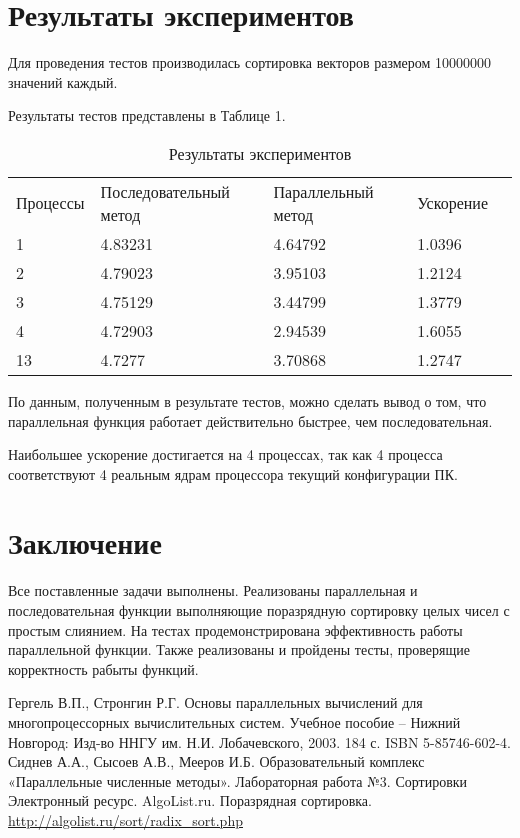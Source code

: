 \documentclass{report}
\begin{document}
	\section*{Результаты экспериментов}
	Для проведения тестов производилась сортировка векторов размером 10000000 значений каждый. 
	\par Результаты тестов представлены в Таблице 1.
	\begin{table}[!h]
		\caption{Результаты экспериментов}
		\centering
		\begin{tabular}{lllll}
			Процессы & Последовательный метод & Параллельный метод & Ускорение   \\
			1        & 4.83231                & 4.64792            & 1.0396      \\
			2        & 4.79023                & 3.95103            & 1.2124      \\
			3        & 4.75129                & 3.44799            & 1.3779      \\
			4        & 4.72903                & 2.94539            & 1.6055      \\
			13       & 4.7277                 & 3.70868            & 1.2747
		\end{tabular}
	\end{table}
	\par По данным, полученным в результате тестов, можно сделать вывод о том, что параллельная функция работает действительно быстрее, чем последовательная.
	\par Наибольшее ускорение достигается на 4 процессах, так как 4 процесса соответствуют 4 реальным ядрам процессора текущий конфигурации ПК.
	\newpage
	
	\section*{Заключение}
	Все поставленные задачи выполнены. Реализованы параллельная и последовательная функции выполняющие поразрядную сортировку целых чисел с простым слиянием. На тестах продемонстрирована эффективность работы параллельной функции. Также реализованы и пройдены тесты, проверящие корректность рабыты функций.
	\newpage
	
	\begin{thebibliography}{1}
         Гергель В.П., Стронгин Р.Г. Основы параллельных вычислений для многопроцессорных вычислительных систем. Учебное пособие – Нижний Новгород: Изд-во ННГУ им. Н.И. Лобачевского, 2003. 184 с. ISBN 5-85746-602-4.
         Сиднев А.А., Сысоев А.В., Мееров И.Б. Образовательный комплекс «Параллельные численные методы». Лабораторная работа №3. Сортировки
         Электронный ресурс. AlgoList.ru. Поразрядная сортировка. \url{http://algolist.ru/sort/radix_sort.php}
	\end{thebibliography}
	\newpage
	
\end{document}
